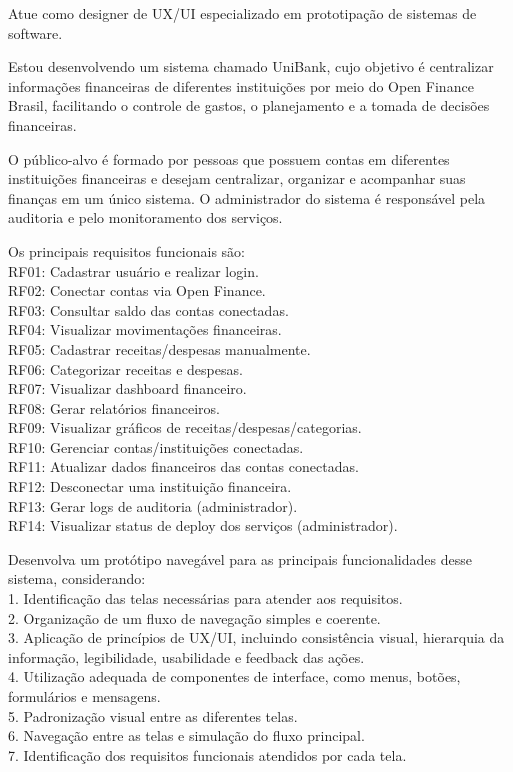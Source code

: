 \documentclass[11pt,a4paper]{article}
\begin{document}
\begin{tcolorbox}[breakable, colback=promptfill, colframe=promptfill, boxrule=0pt, arc=2pt, left=8pt, right=8pt, top=6pt, bottom=6pt, fontupper=\footnotesize, before upper={\setlength{\parskip}{5pt}}]
Atue como designer de UX/UI especializado em prototipação de sistemas de software.

Estou desenvolvendo um sistema chamado UniBank, cujo objetivo é centralizar informações financeiras de diferentes instituições por meio do Open Finance Brasil, facilitando o controle de gastos, o planejamento e a tomada de decisões financeiras.

O público-alvo é formado por pessoas que possuem contas em diferentes instituições financeiras e desejam centralizar, organizar e acompanhar suas finanças em um único sistema. O administrador do sistema é responsável pela auditoria e pelo monitoramento dos serviços.

Os principais requisitos funcionais são:\\
RF01: Cadastrar usuário e realizar login.\\
RF02: Conectar contas via Open Finance.\\
RF03: Consultar saldo das contas conectadas.\\
RF04: Visualizar movimentações financeiras.\\
RF05: Cadastrar receitas/despesas manualmente.\\
RF06: Categorizar receitas e despesas.\\
RF07: Visualizar dashboard financeiro.\\
RF08: Gerar relatórios financeiros.\\
RF09: Visualizar gráficos de receitas/despesas/categorias.\\
RF10: Gerenciar contas/instituições conectadas.\\
RF11: Atualizar dados financeiros das contas conectadas.\\
RF12: Desconectar uma instituição financeira.\\
RF13: Gerar logs de auditoria (administrador).\\
RF14: Visualizar status de deploy dos serviços (administrador).

Desenvolva um protótipo navegável para as principais funcionalidades desse sistema, considerando:\\
1. Identificação das telas necessárias para atender aos requisitos.\\
2. Organização de um fluxo de navegação simples e coerente.\\
3. Aplicação de princípios de UX/UI, incluindo consistência visual, hierarquia da informação, legibilidade, usabilidade e feedback das ações.\\
4. Utilização adequada de componentes de interface, como menus, botões, formulários e mensagens.\\
5. Padronização visual entre as diferentes telas.\\
6. Navegação entre as telas e simulação do fluxo principal.\\
7. Identificação dos requisitos funcionais atendidos por cada tela.


\end{tcolorbox}
\end{document}

